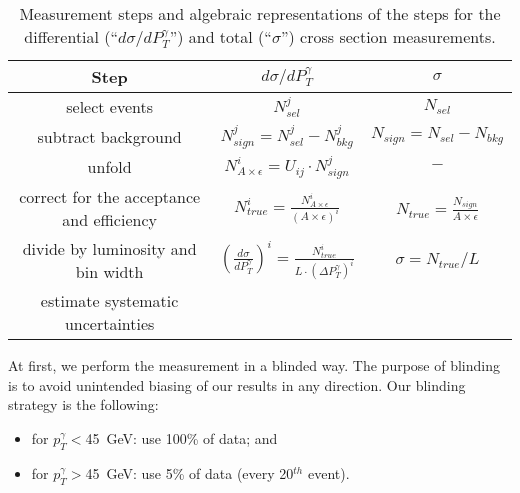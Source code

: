 \begin{table}[h]
  \small
  \begin{center}
  \caption{Measurement steps and algebraic representations of the steps for the differential (``$d\sigma/dP_{T}^{\gamma}$'') and total (``$\sigma$'') cross section measurements. }
  \begin{tabular}{|c|c|c|}
    \hline
    Step & $d\sigma/dP_{T}^{\gamma}$ & $\sigma$ \\ \hline
    select events & $N_{sel}^j$ &    $N_{sel}$       \\ \hline
    subtract background & $N_{sign}^j = N_{sel}^j - N_{bkg}^j$ &    $N_{sign}=N_{sel}-N_{bkg}$       \\ \hline
    unfold   & $N_{A\times\epsilon}^i = U_{ij} \cdot N_{sign}^j$ &    $-$       \\ \hline
    correct for the acceptance and efficiency & $N_{true}^i = \frac{N_{A\times\epsilon}^i}{(A \times\epsilon)^i}$ &  $N_{true}=\frac{N_{sign}}{A\times\epsilon}$       \\ \hline
    divide by luminosity and bin width & $ \left( \frac{d\sigma}{dP_{T}^\gamma} \right) ^i = \frac{N_{true}^i}{L \cdot (\Delta P_T^\gamma)^i}$  &  $\sigma = N_{true}/L$       \\ \hline
    estimate systematic uncertainties &  &         \\ \hline
  \end{tabular}
  \label{tab:analysisOutline}
  \end{center}
\end{table}

At first, we perform the measurement in a blinded way. The purpose of blinding is to avoid unintended biasing of our results in any direction. Our blinding strategy is the following:
\begin{itemize}
  \item for $p_T^{\gamma}<$45~GeV: use 100\% of data; and
  \item for $p_T^{\gamma}>$45~GeV: use 5\% of data (every 20$^{th}$ event).
\end{itemize}


